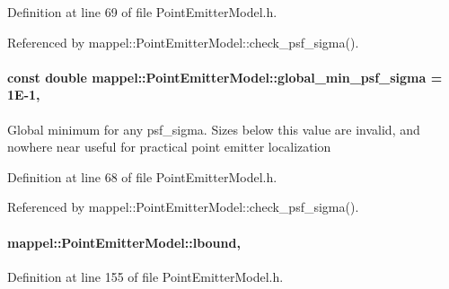 Definition at line 69 of file Point\+Emitter\+Model.\+h.



Referenced by mappel\+::\+Point\+Emitter\+Model\+::check\+\_\+psf\+\_\+sigma().

\paragraph[{\texorpdfstring{global\+\_\+min\+\_\+psf\+\_\+sigma}{global_min_psf_sigma}}]{\setlength{\rightskip}{0pt plus 5cm}const double mappel\+::\+Point\+Emitter\+Model\+::global\+\_\+min\+\_\+psf\+\_\+sigma = 1\+E-\/1\hspace{0.3cm}{\ttfamily [static]}, {\ttfamily [inherited]}}\hypertarget{classmappel_1_1PointEmitterModel_a77d0ca98d77cb8b94117ece2a5b182a4}{}\label{classmappel_1_1PointEmitterModel_a77d0ca98d77cb8b94117ece2a5b182a4}
Global minimum for any psf\+\_\+sigma. Sizes below this value are invalid, and nowhere near useful for practical point emitter localization 

Definition at line 68 of file Point\+Emitter\+Model.\+h.



Referenced by mappel\+::\+Point\+Emitter\+Model\+::check\+\_\+psf\+\_\+sigma().

\paragraph[{\texorpdfstring{lbound}{lbound}}]{ mappel\+::\+Point\+Emitter\+Model\+::lbound\hspace{0.3cm}{\ttfamily [protected]}, {\ttfamily [inherited]}}\hypertarget{classmappel_1_1PointEmitterModel_a889bc82f74cfa654da121e5770296ab2}{}\label{classmappel_1_1PointEmitterModel_a889bc82f74cfa654da121e5770296ab2}


Definition at line 155 of file Point\+Emitter\+Model.\+h.



